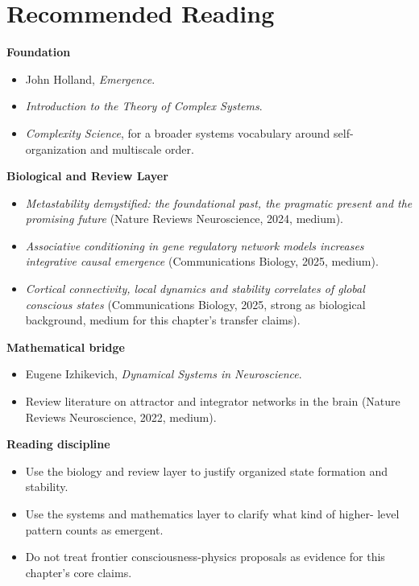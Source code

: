 \section{Recommended Reading}

\begin{readingbox}
\textbf{Foundation}
\begin{itemize}[nosep]
  \item John Holland, \emph{Emergence}.
  \item \emph{Introduction to the Theory of Complex Systems}.
  \item \emph{Complexity Science}, for a broader systems vocabulary around
        self-organization and multiscale order.
\end{itemize}
\textbf{Biological and Review Layer}
\begin{itemize}[nosep]
  \item \emph{Metastability demystified: the foundational past, the pragmatic
        present and the promising future} (Nature Reviews Neuroscience, 2024,
        medium).
  \item \emph{Associative conditioning in gene regulatory network models
        increases integrative causal emergence} (Communications Biology, 2025,
        medium).
  \item \emph{Cortical connectivity, local dynamics and stability correlates of
        global conscious states} (Communications Biology, 2025, strong as
        biological background, medium for this chapter's transfer claims).
\end{itemize}
\textbf{Mathematical bridge}
\begin{itemize}[nosep]
  \item Eugene Izhikevich, \emph{Dynamical Systems in Neuroscience}.
  \item Review literature on attractor and integrator networks in the brain
        (Nature Reviews Neuroscience, 2022, medium).
\end{itemize}
\textbf{Reading discipline}
\begin{itemize}[nosep]
  \item Use the biology and review layer to justify organized state formation
        and stability.
  \item Use the systems and mathematics layer to clarify what kind of higher-
        level pattern counts as emergent.
  \item Do not treat frontier consciousness-physics proposals as evidence for
        this chapter's core claims.
\end{itemize}
\end{readingbox}
